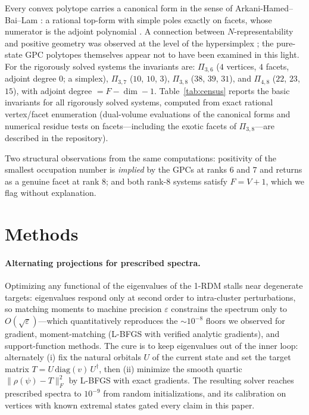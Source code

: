 \documentclass[11pt]{article}
\begin{document}
Every convex polytope carries a canonical form in the sense of
Arkani-Hamed--Bai--Lam \cite{ABL2018}: a rational top-form with simple poles
exactly on facets, whose numerator is the adjoint polynomial
\cite{KohnRanestad}. A connection between $N$-representability and positive
geometry was observed at the level of the hypersimplex
\cite{Castillo2021,LPW2020}; the pure-state GPC polytopes themselves appear
not to have been examined in this light. For the rigorously solved systems the invariants are: $\Pi_{3,6}$ ($4$ vertices, $4$ facets, adjoint degree $0$; a simplex), $\Pi_{3,7}$ ($10$, $10$, $3$), $\Pi_{3,8}$ ($38$, $39$, $31$), and $\Pi_{4,8}$ ($22$, $23$, $15$), with adjoint degree $=F-\dim-1$. Table~\ref{tab:census} reports the
basic invariants for all rigorously solved systems, computed from exact
rational vertex/facet enumeration (dual-volume evaluations of the canonical
forms and numerical residue tests on facets---including the exotic facets of
$\Pi_{3,8}$---are described in the repository).


Two structural observations from the same computations: positivity of the
smallest occupation number is \emph{implied} by the GPCs at ranks $6$ and
$7$ and returns as a genuine facet at rank $8$; and both rank-$8$ systems
satisfy $F = V+1$, which we flag without explanation.

\section{Methods}
\label{sec:methods}

\paragraph{Alternating projections for prescribed spectra.}
Optimizing any functional of the eigenvalues of the 1-RDM stalls near
degenerate targets: eigenvalues respond only at second order to
intra-cluster perturbations, so matching moments to machine precision
$\varepsilon$ constrains the spectrum only to
$O(\sqrt{\varepsilon})$---which quantitatively reproduces the
$\sim\!10^{-8}$ floors we observed for gradient, moment-matching (L-BFGS
with verified analytic gradients), and support-function methods. The cure is
to keep eigenvalues out of the inner loop: alternately (i) fix the natural
orbitals $U$ of the current state and set the target matrix
$T = U\,\mathrm{diag}(v)\,U^\dagger$, then (ii) minimize the smooth
quartic $\|\rho(\psi) - T\|_F^2$ by L-BFGS with exact gradients. The
resulting solver reaches prescribed spectra to $10^{-9}$ from random
initializations, and its calibration on vertices with known extremal states
gated every claim in this paper.
\end{document}
